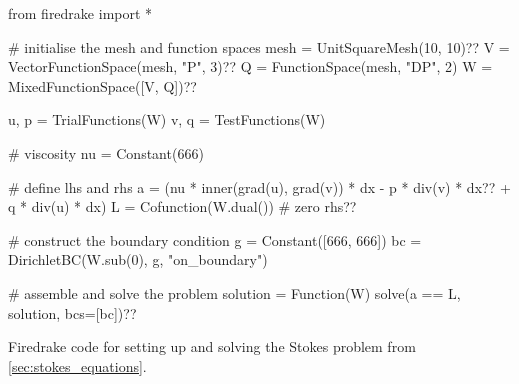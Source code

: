\documentclass[thesis]{subfiles}
\begin{document}
\begin{listing}
  \centering
  \begin{minipage}{.9\textwidth}
    \begin{pyalg2}
      from firedrake import *

      # initialise the mesh and function spaces
      mesh = UnitSquareMesh(10, 10)?\label{code:stokes_init_mesh}?
      V = VectorFunctionSpace(mesh, "P", 3)?\label{code:stokes_spaces_begin}?
      Q = FunctionSpace(mesh, "DP", 2)
      W = MixedFunctionSpace([V, Q])?\label{code:stokes_spaces_end}?

      u, p = TrialFunctions(W)
      v, q = TestFunctions(W)

      # viscosity
      nu = Constant(666)

      # define lhs and rhs
      a = (nu * inner(grad(u), grad(v)) * dx - p * div(v) * dx?\label{code:stokes_bilinear_form}?
           + q * div(u) * dx)
      L = Cofunction(W.dual())  # zero rhs?\label{code:stokes_linear_form}?

      # construct the boundary condition
      g = Constant([666, 666])
      bc = DirichletBC(W.sub(0), g, "on_boundary")

      # assemble and solve the problem
      solution = Function(W)
      solve(a == L, solution, bcs=[bc])?\label{code:stokes_solve}?
    \end{pyalg2}
  \end{minipage}
  \caption{
    Firedrake code for setting up and solving the Stokes problem from \cref{sec:stokes_equations}.
  }
  \label{listing:stokes_demo}
\end{listing}
\end{document}
